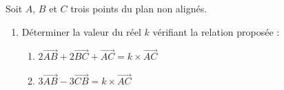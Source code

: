 \begin{exo}{}
	Soit $A$, $B$ et $C$ trois points du plan non alignés.
	\begin{enumerate}
		\item Déterminer la valeur du réel $k$ vérifiant la relation proposée :
		      \begin{enumerate}[itemsep=2mm]
			      \vspace*{1mm}
			      \item $2\vec{AB} + 2\vec{BC} + \vec{AC} = k\times\vec{AC}$
			      \item $3\vec{AB} - 3\vec{CB} = k\times\vec{AC}$
		      \end{enumerate}
	\end{enumerate}
\end{exo}
